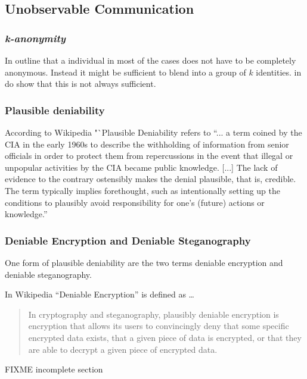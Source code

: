 \subsection{Unobservable Communication}
\cite{ccs2011-cirripede}
\subsubsection{\itshape{k}-anonymity}
In \cite{k-anonymous:ccs2003} \citeauthor{k-anonymous:ccs2003} outline that a individual in most of the cases does not have to be completely anonymous. Instead it might be sufficient to blend into a group of $k$ identities. in \cite{wpes10-unraveling} \citeauthor{wpes10-unraveling} do show that this is not always sufficient. 

\subsubsection{Plausible deniability}
According to Wikipedia\cite{wiki:plausibleDeniability} "`Plausible Deniability refers to "`... a term coined by the CIA in the early 1960s to describe the withholding of information from senior officials in order to protect them from repercussions in the event that illegal or unpopular activities by the CIA became public knowledge. [...]  The lack of evidence to the contrary ostensibly makes the denial plausible, that is, credible. The term typically implies forethought, such as intentionally setting up the conditions to plausibly avoid responsibility for one's (future) actions or knowledge."'\par

\subsubsection{Deniable Encryption and Deniable Steganography}
One form of plausible deniability are the two terms deniable encryption and deniable steganography.

In Wikipedia\cite{wiki:deniableEncryption} "`Deniable Encryption"' is defined as \ldots
\begin{quote}
In cryptography and steganography, plausibly deniable encryption is encryption that allows its users to convincingly deny that some specific encrypted data exists, that a given piece of data is encrypted, or that they are able to decrypt a given piece of encrypted data.
\end{quote}

\cite{truecryptDFS}
FIXME incomplete section

